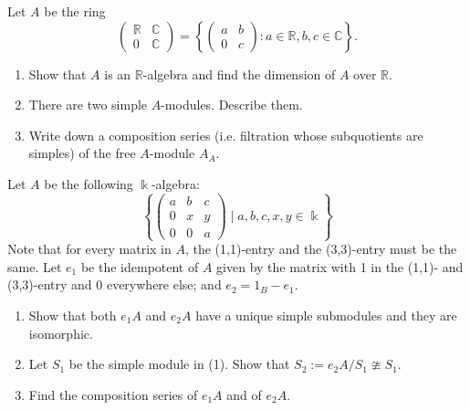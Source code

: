 \documentclass[12pt]{article}
\begin{document}
\begin{question}
Let $A$ be the ring
\[
\begin{pmatrix}
\mathbb{R} & \mathbb{C} \\ 0 & \mathbb{C}
\end{pmatrix} = \left\{ \begin{pmatrix} a&b\\0&c \end{pmatrix} : a\in \mathbb{R}, b,c\in \mathbb{C} \right\}.
\]
\begin{enumerate}
\item Show that $A$ is an $\mathbb{R}$-algebra and find the dimension of $A$ over $\mathbb{R}$.

\item There are two simple $A$-modules.  Describe them.

\item Write down a composition series (i.e. filtration whose subquotients are simples) of the free $A$-module $A_A$.
\end{enumerate}
\end{question}


\begin{question}
Let $A$ be the following $\Bbbk$-algebra:
\[
\left\{
\begin{pmatrix}
a & b & c \\ 0& x & y \\ 0 & 0& a
\end{pmatrix} \mid a,b,c,x,y\in \Bbbk
\right\}
\]
Note that for every matrix in $A$, the (1,1)-entry and the (3,3)-entry must be the same.
Let $e_1$ be the idempotent of $A$ given by the matrix with 1 in the (1,1)- and (3,3)-entry and 0 everywhere else; and $e_2=1_B-e_1$.

\begin{enumerate}
\item Show that both $e_1A$ and $e_2A$ have a unique simple submodules and they are isomorphic.

\item Let $S_1$ be the simple module in (1).  Show that $S_2:=e_2A/S_1 \ncong S_1$.

\item Find the composition series of $e_1A$ and of $e_2A$.
\end{enumerate}
\end{question}
\end{document}
